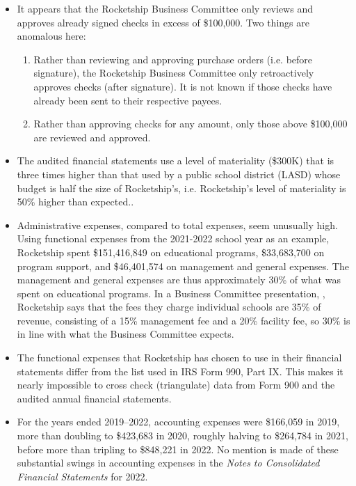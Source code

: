 \begin{itemize}
  \item It appears that the Rocketship Business Committee only reviews and approves already signed checks in excess of \$100,000. Two things are anomalous here:
  \begin{enumerate}
    \item Rather than reviewing and approving purchase orders (i.e. before signature), the Rocketship Business Committee only retroactively approves checks (after signature). It is not known if those checks have already been sent to their respective payees.
    \item Rather than approving checks for any amount, only those above \$100,000 are reviewed and approved.
  \end{enumerate}
  \item The audited financial statements use a level of materiality (\$300K) that is three times higher than that used by a public school district (LASD) whose budget is half the size of Rocketship's, i.e. Rocketship's level of materiality is 50\% higher than expected..

  \item Administrative expenses, compared to total expenses, seem unusually high. Using functional expenses from the 2021-2022 school year as an example, Rocketship spent \$151,416,849 on educational programs, \$33,683,700 on program support, and \$46,401,574 on management and general expenses.  The management and general expenses are thus approximately 30\% of what was spent on educational programs. In a Business Committee presentation, \textcite[28]{Mukhopadhyay2013}, Rocketship says that the fees they charge individual schools are 35\% of revenue, consisting of a 15\% management fee and a 20\% facility fee, so 30\% is in line with what the Business Committee expects.

  \item The functional expenses that Rocketship has chosen to use in their financial statements differ from the list used in IRS Form 990, Part IX. This makes it nearly impossible to cross check (triangulate) data from Form 900 and the audited annual financial statements.

  \item  For the years ended 2019–2022, accounting expenses were \$166,059 in 2019, more than doubling to \$423,683 in 2020, roughly halving to \$264,784 in 2021, before more than tripling to \$848,221 in 2022. No mention is made of these substantial swings in accounting expenses in the \textit{Notes to Consolidated Financial Statements} for 2022.


\end{itemize}
